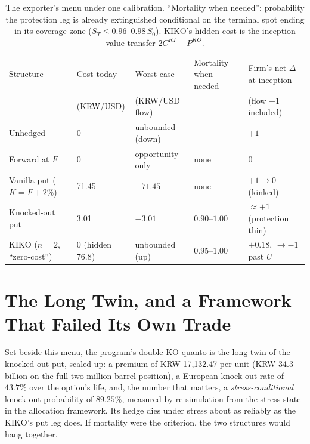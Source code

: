 \documentclass[11pt,a4paper]{article}
\begin{document}
\begin{table}[h]
\centering
\small
\begin{tabular}{p{}p{}p{}p{}p{}}
\toprule
Structure & Cost today & Worst case & Mortality when needed & Firm's net $\Delta$ at inception \\
 & (KRW/USD) & (KRW/USD flow) & & (flow $+1$ included) \\
\midrule
Unhedged & 0 & unbounded (down) & -- & $+1$ \\
Forward at $F$ & 0 & opportunity only & none & $0$ \\
Vanilla put ($K{=}F{+}2\%$) & 71.45 & $-71.45$ & none & $+1\!\rightarrow\!0$ (kinked) \\
Knocked-out put & 3.01 & $-3.01$ & $0.90$--$1.00$ & $\approx+1$ (protection thin) \\
KIKO ($n{=}2$, ``zero-cost'') & 0 (hidden $76.8$) & unbounded (up) & $0.95$--$1.00$ & $+0.18$, $\to-1$ past $U$ \\
\bottomrule
\end{tabular}
\caption{The exporter's menu under one calibration. ``Mortality when needed'': probability the protection leg is already extinguished conditional on the terminal spot ending in its coverage zone ($S_T\le0.96$--$0.98\,S_0$). KIKO's hidden cost is the inception value transfer $2C^{KI}-P^{KO}$.}
\label{tab:menu}
\end{table}

\section{The Long Twin, and a Framework That Failed Its Own Trade}
\label{sec:twin}

Set beside this menu, the program's double-KO quanto is the long twin of the knocked-out put, scaled up: a premium of KRW 17{,}132.47 per unit (KRW 34.3 billion on the full two-million-barrel position), a European knock-out rate of $43.7\%$ over the option's life, and, the number that matters, a \emph{stress-conditional} knock-out probability of $89.25\%$, measured by re-simulation from the stress state in the allocation framework. Its hedge dies under stress about as reliably as the KIKO's put leg does. If mortality were the criterion, the two structures would hang together.
\end{document}
